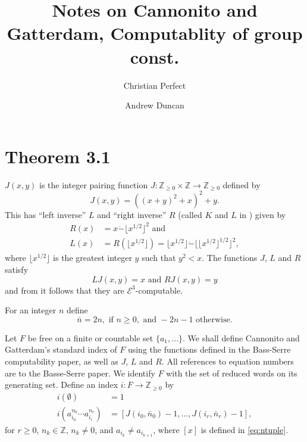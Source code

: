 \documentclass[a4paper]{article}
\newcommand{\grz}[1]{$\mathcal{E}^{#1}$}	%
\newcommand{\ZZ}{\mathbb{Z}}
\newcommand{\maps}{\longrightarrow}
\newcommand{\psub}{\dot -}	%
\theoremstyle{plain}
\theoremstyle{definition}
\begin{document}
\title{Notes on Cannonito and Gatterdam, Computablity of group const.}
\author{Christian Perfect \and Andrew Duncan}
\maketitle

\section*{Theorem 3.1}


$J(x,y)$ is the  integer pairing function $J:\ZZ_{\geq 0} \times \ZZ \rightarrow \ZZ_{\geq 0}$ defined by 
\[J(x,y)=((x+y)^2+x)^2+y.\]
This has ``left inverse'' $L$ and ``right inverse'' $R$ (called $K$ and
$L$ in \cite{Cannonito_1973}) given by
\begin{align*}
R(x)&=x\psub \lfloor x^{1/2}\rfloor^2 \textrm{ and}\\
L(x)&=R(\lfloor x^{1/2}\rfloor)=\lfloor x^{1/2}\rfloor \psub \lfloor\lfloor x^{1/2} \rfloor^{1/2} \rfloor^2,
\end{align*}
where $\lfloor x^{1/2}\rfloor$ is the greatest integer $y$ such that 
$y^2<x$. 
The functions $J$, $L$ and $R$ satisfy 
\[LJ(x,y)=x\textrm{ and } RJ(x,y)=y\] 
and from \cite{Ritchie_1965} it follows that they are \grz{3}-computable.

For an integer $n$ define 
\[\bar n= 2n, \textrm{ if } n\ge 0,\textrm{ and } -2n-1 \textrm{ otherwise}.\]

Let $F$ be free on a finite or  countable set $\{a_1,\ldots \}$. 
We shall define Cannonito and Gatterdam's 
 standard index of $F$ using the functions defined
in the Bass-Serre computability paper, as well as $J$, $L$ and $R$. 
All references to equation numbers are to the Basse-Serre paper. 
We identify $F$ with the set of reduced words on its generating set. 
Define
an index $i:F\maps \ZZ_{\geq 0}$ by 
\begin{align*}
i(\emptyset)&= 1\\
i(a_{i_0}^{n_0}\cdots a_{i_r}^{n_r})&=[J(i_0,\bar n_0)-1,\ldots, J(i_r,\bar n_r)-1],
\end{align*}
for $r\ge 0$, $n_k\in \ZZ$, $n_k\neq 0$, 
and $a_{i_k}\neq a_{i_{k+1}}$, where $[x]$ is defined in \eqref{eq:ntuple}. 



\end{document}
